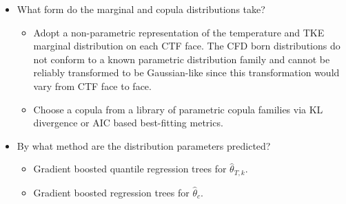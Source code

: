 \documentclass[t, pdftex]{beamer}
\begin{document}
\begin{frame}
{\begin{itemize}
        \item What form do the marginal and copula distributions take?
        \begin{itemize}
            \item Adopt a non-parametric representation of the temperature and TKE marginal distribution on each CTF face.  The CFD born distributions do not conform to a known parametric distribution family and cannot be reliably transformed to be Gaussian-like since this transformation would vary from CTF face to face.
            \item Choose a copula from a library of parametric copula families via KL divergence or AIC based best-fitting metrics.
        \end{itemize}        
        \item By what method are the distribution parameters predicted?
        \begin{itemize}
            \item Gradient boosted quantile regression trees for $\hat \theta_{T,k}$.
            \item Gradient boosted regression trees for $\hat \theta_{c}$.
        \end{itemize}
    \end{itemize}
}
\end{frame}

\end{document}
